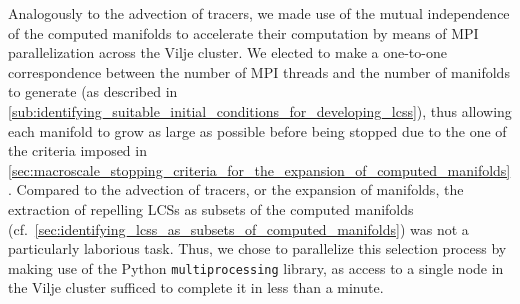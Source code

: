 Analogously to the advection of tracers, we made use of the mutual independence
of the computed manifolds to accelerate their computation by means of MPI
parallelization across the Vilje cluster. We elected to make a one-to-one
correspondence between the number of MPI threads and the number of manifolds to
generate (as described in
\cref{sub:identifying_suitable_initial_conditions_for_developing_lcss}),
thus allowing each manifold to grow as large as possible before being stopped
due to the one of the criteria imposed in
\cref{sec:macroscale_stopping_criteria_for_the_expansion_of_computed_manifolds}.
Compared to the advection of tracers, or the expansion of manifolds,
the extraction of repelling LCSs as subsets of the computed manifolds
(cf.\ \cref{sec:identifying_lcss_as_subsets_of_computed_manifolds}) was not
a particularly laborious task. Thus, we chose to parallelize this
selection process by making use of the Python \texttt{multiprocessing} library,
as access to a single node in the Vilje cluster sufficed to complete it in
less than a minute.

%
%
%
%
%
%
%
%
%

